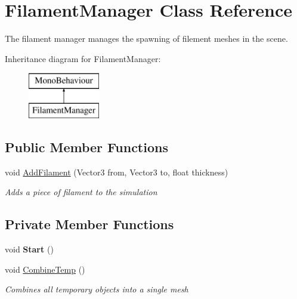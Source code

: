 \hypertarget{class_filament_manager}{}\section{Filament\+Manager Class Reference}
\label{class_filament_manager}


The filament manager manages the spawning of filement meshes in the scene.  


Inheritance diagram for Filament\+Manager\+:\begin{figure}[H]
\begin{center}
\leavevmode
\includegraphics[height=2.000000cm]{class_filament_manager}
\end{center}
\end{figure}
\subsection*{Public Member Functions}
\begin{DoxyCompactItemize}
\item 
void \hyperlink{class_filament_manager_afda4accf27e892725d2a9974607421b6}{Add\+Filament} (Vector3 from, Vector3 to, float thickness)
\begin{DoxyCompactList}\small\item\em Adds a piece of filament to the simulation \end{DoxyCompactList}\end{DoxyCompactItemize}
\subsection*{Private Member Functions}
\begin{DoxyCompactItemize}
\item 
\mbox{\label{class_filament_manager_ab870c17f0e1e66687fb56bfc46e9c2be}} 
void {\bfseries Start} ()
\item 
void \hyperlink{class_filament_manager_a088bc0f0147322c2970612c3b535cc3f}{Combine\+Temp} ()
\begin{DoxyCompactList}\small\item\em Combines all temporary objects into a single mesh \end{DoxyCompactList}\end{DoxyCompactItemize}
